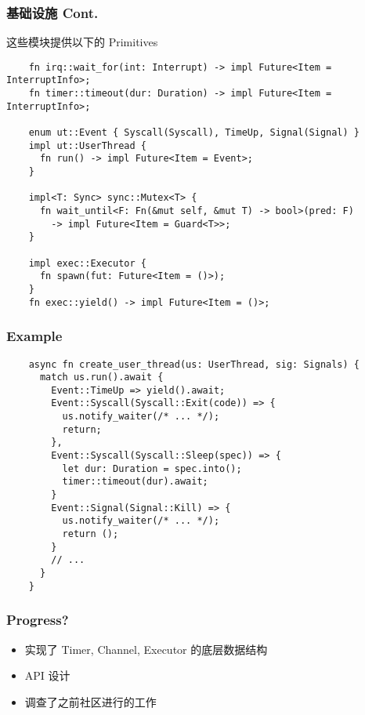 \documentclass[UTF-8]{ctexbeamer}
\begin{document}
\begin{frame}[fragile]
  \frametitle{基础设施 Cont.}

  这些模块提供以下的 Primitives
  \vspace{1em}

  {
  \scriptsize
  \begin{verbatim}
    fn irq::wait_for(int: Interrupt) -> impl Future<Item = InterruptInfo>;
    fn timer::timeout(dur: Duration) -> impl Future<Item = InterruptInfo>;

    enum ut::Event { Syscall(Syscall), TimeUp, Signal(Signal) }
    impl ut::UserThread {
      fn run() -> impl Future<Item = Event>;
    }

    impl<T: Sync> sync::Mutex<T> {
      fn wait_until<F: Fn(&mut self, &mut T) -> bool>(pred: F)
        -> impl Future<Item = Guard<T>>;
    }

    impl exec::Executor {
      fn spawn(fut: Future<Item = ()>);
    }
    fn exec::yield() -> impl Future<Item = ()>;
  \end{verbatim}
  }
\end{frame}

\begin{frame}[fragile]
  \frametitle{Example}

  \scriptsize
  \begin{verbatim}
    async fn create_user_thread(us: UserThread, sig: Signals) {
      match us.run().await {
        Event::TimeUp => yield().await;
        Event::Syscall(Syscall::Exit(code)) => {
          us.notify_waiter(/* ... */);
          return;
        },
        Event::Syscall(Syscall::Sleep(spec)) => {
          let dur: Duration = spec.into();
          timer::timeout(dur).await;
        }
        Event::Signal(Signal::Kill) => {
          us.notify_waiter(/* ... */);
          return ();
        }
        // ...
      }
    }
  \end{verbatim}
\end{frame}

\begin{frame}
  \frametitle{Progress?}

  \begin{itemize}
    \item 实现了 Timer, Channel, Executor 的底层数据结构
    \item API 设计
    \item 调查了之前社区进行的工作
  \end{itemize}
\end{frame}
  
\end{document}
